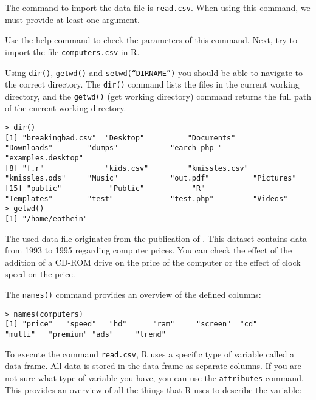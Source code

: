 The command to import the data file is \texttt{read.csv}. When using this command, we must provide at least one argument.


\begin{exercise}
    Use the help command to check the parameters of this command. Next, try to import the file \texttt{computers.csv} in R.
\end{exercise}

Using \texttt{dir()}, \texttt{getwd()} and \texttt{setwd(``DIRNAME'')} you should be able to navigate to the correct directory. The \texttt{dir()} command lists the files in the current working directory, and the \texttt{getwd()} (get working directory) command returns the full path of the current working directory.

\begin{lstlisting}[breaklines=true]
> dir()
[1] "breakingbad.csv"  "Desktop"          "Documents"        "Downloads"        "dumps"            "earch php-"       "examples.desktop"
[8] "f.r"              "kids.csv"         "kmissles.csv"     "kmissles.ods"     "Music"            "out.pdf"          "Pictures"        
[15] "public"           "Public"           "R"                "Templates"        "test"             "test.php"         "Videos"          
> getwd()
[1] "/home/eothein"
\end{lstlisting}

The used data file originates from the publication of \autocite{Stengos2005}. 
This dataset contains data from 1993 to 1995 regarding computer prices. 
You can check the effect of the addition of a CD-ROM drive on the price of the computer or the effect of clock speed on the price.

The \texttt{names()} command provides an overview of the defined columns:

\begin{lstlisting}[breaklines=true]
> names(computers)
[1] "price"   "speed"   "hd"      "ram"     "screen"  "cd"      "multi"   "premium" "ads"     "trend"
\end{lstlisting}

To execute the command \texttt{read.csv}, R uses a specific type of variable called a data frame. 
All data is stored in the data frame as separate columns.
If you are not sure what type of variable you have, you can use the \texttt{attributes} command.
This provides an overview of all the things that R uses to describe the variable:

